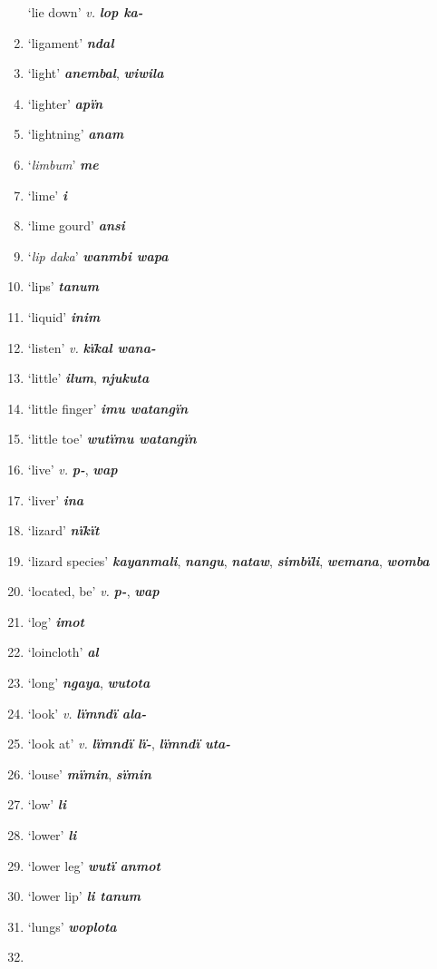 \begin{enumerate}[noitemsep, label={}, align=left, widest=190, labelsep=1ex,leftmargin=*,itemindent=-10pt]
‘lie down’ \textit{v.} \textbf{\textit{lop ka-}} \item
‘ligament’ \textbf{\textit{ndal}} \item
‘light’ \textbf{\textit{anembal}}, \textbf{\textit{wiwila}} \item
‘lighter’ \textbf{\textit{apïn}} \item
‘lightning’ \textbf{\textit{anam}} \item
‘\textit{limbum}’ \textbf{\textit{me}} \item
‘lime’ \textbf{\textit{i}} \item
‘lime gourd’ \textbf{\textit{ansi}} \item
‘\textit{lip daka}’ \textbf{\textit{wanmbi wapa}} \item
‘lips’ \textbf{\textit{tanum}} \item
‘liquid’ \textbf{\textit{inim}} \item
‘listen’ \textit{v.} \textbf{\textit{kïkal wana-}} \item
‘little’ \textbf{\textit{ilum}}, \textbf{\textit{njukuta}} \item
‘little finger’ \textbf{\textit{imu watangïn}} \item
‘little toe’ \textbf{\textit{wutïmu watangïn}} \item
‘live’ \textit{v.} \textbf{\textit{p-}}, \textbf{\textit{wap}} \item
‘liver’ \textbf{\textit{ina}} \item
‘lizard’ \textbf{\textit{nïkït}} \item
‘lizard species’ \textbf{\textit{kayanmali}}, \textbf{\textit{nangu}}, \textbf{\textit{nataw}}, \textbf{\textit{simbïli}}, \textbf{\textit{wemana}}, \textbf{\textit{womba}} \item
‘located, be’ \textit{v.} \textbf{\textit{p-}}, \textbf{\textit{wap}} \item
‘log’ \textbf{\textit{imot}} \item
‘loincloth’ \textbf{\textit{al}} \item
‘long’ \textbf{\textit{ngaya}}, \textbf{\textit{wutota}} \item
‘look’ \textit{v.} \textbf{\textit{lïmndï ala-}} \item
‘look at’ \textit{v.} \textbf{\textit{lïmndï lï-}}, \textbf{\textit{lïmndï uta-}} \item
‘louse’ \textbf{\textit{mïmin}}, \textbf{\textit{sïmin}} \item
‘low’ \textbf{\textit{li}} \item
‘lower’ \textbf{\textit{li}} \item
‘lower leg’ \textbf{\textit{wutï anmot}} \item
‘lower lip’ \textbf{\textit{li tanum}} \item
‘lungs’ \textbf{\textit{woplota}}\\ \item


\end{enumerate}
